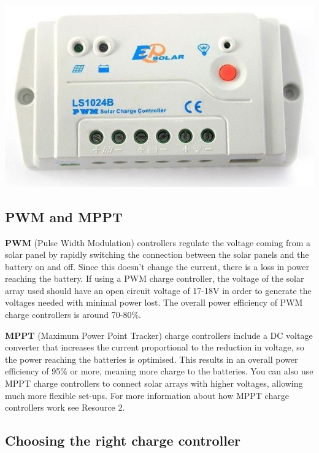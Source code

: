 \documentclass{article}
\theoremstyle{definition}
\theoremstyle{definition}
\theoremstyle{remark}
\begin{document}
  \begin{center}
    \includegraphics[width=0.25\paperwidth]{../Images/image_6_1_(charge_controller).png}
  \end{center}

  {\color{blue}\subsection{PWM and MPPT}} %
  \label{sub:pwm_and_mppt}

    \textbf{PWM} (Pulse Width Modulation) controllers regulate the voltage coming from a solar panel by rapidly switching the connection between the solar panels and the battery on and off. Since this doesn’t change the current, there is a loss in power reaching the battery. If using a PWM charge controller, the voltage of the solar array used should have an open circuit voltage of 17-18V in order to generate the voltages needed with minimal power lost. The overall power efficiency of PWM charge controllers is around 70-80\%.

    \textbf{MPPT} (Maximum Power Point Tracker) charge controllers include a DC voltage converter that increases the current proportional to the reduction in voltage, so the power reaching the batteries is optimised. This results in an overall power efficiency of 95\% or more, meaning more charge to the batteries. You can also use MPPT charge controllers to connect solar arrays with higher voltages, allowing much more flexible set-ups. For more information about how MPPT charge controllers work see Resource 2.
  

  {\color{blue}\subsection{Choosing the right charge controller}} %
  \label{sub:choosing_the_right_charge_controller}
\end{document}
